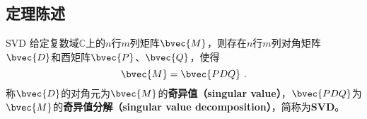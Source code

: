 



\subsection{定理陈述}
\begin{theorem}{SVD}
给定复数域$\mathbb{C}$上的$n$行$m$列矩阵$\bvec{M}$，则存在$n$行$m$列对角矩阵$\bvec{D}$和酉矩阵$\bvec{P}$、$\bvec{Q}$，使得
\begin{equation}
\bvec{M} = \bvec{PDQ}~. 
\end{equation}
称$\bvec{D}$的对角元为$\bvec{M}$的\textbf{奇异值（singular value）}，$\bvec{PDQ}$为$\bvec{M}$的\textbf{奇异值分解（singular value decomposition）}，简称为\textbf{SVD}。
\end{theorem}
























